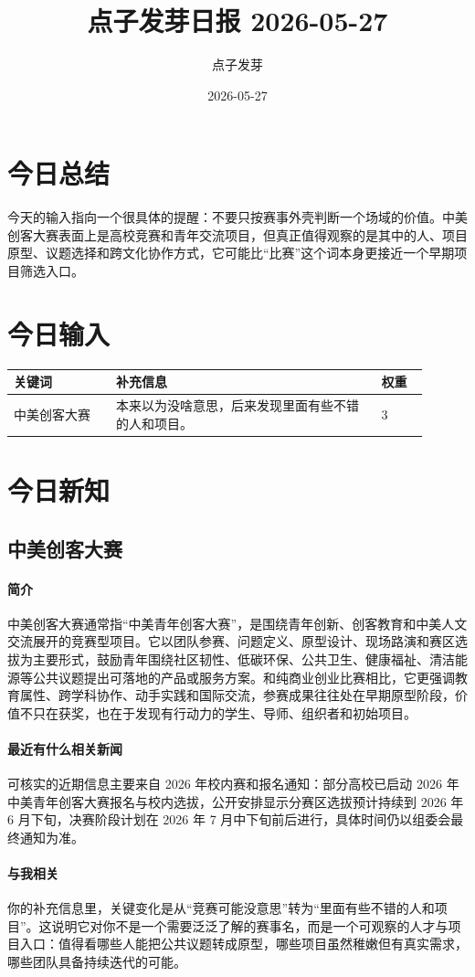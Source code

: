 \documentclass[UTF8,zihao=-4]{ctexart}
\title{\bfseries 点子发芽日报 2026-05-27}
\author{点子发芽}
\date{2026-05-27}
\begin{document}
\maketitle
\section*{今日总结}
今天的输入指向一个很具体的提醒：不要只按赛事外壳判断一个场域的价值。中美创客大赛表面上是高校竞赛和青年交流项目，但真正值得观察的是其中的人、项目原型、议题选择和跨文化协作方式，它可能比“比赛”这个词本身更接近一个早期项目筛选入口。
\section*{今日输入}
\begin{longtable}{|p{0.22\linewidth}|p{0.58\linewidth}|p{0.10\linewidth}|}
\hline
\textbf{关键词} & \textbf{补充信息} & \textbf{权重} \\
\hline
中美创客大赛 & 本来以为没啥意思，后来发现里面有些不错的人和项目。 & 3 \\
\hline
\end{longtable}
\section*{今日新知}
\subsection*{中美创客大赛}
\paragraph{简介} 中美创客大赛通常指“中美青年创客大赛”，是围绕青年创新、创客教育和中美人文交流展开的竞赛型项目。它以团队参赛、问题定义、原型设计、现场路演和赛区选拔为主要形式，鼓励青年围绕社区韧性、低碳环保、公共卫生、健康福祉、清洁能源等公共议题提出可落地的产品或服务方案。和纯商业创业比赛相比，它更强调教育属性、跨学科协作、动手实践和国际交流，参赛成果往往处在早期原型阶段，价值不只在获奖，也在于发现有行动力的学生、导师、组织者和初始项目。
\paragraph{最近有什么相关新闻} 可核实的近期信息主要来自 2026 年校内赛和报名通知：部分高校已启动 2026 年中美青年创客大赛报名与校内选拔，公开安排显示分赛区选拔预计持续到 2026 年 6 月下旬，决赛阶段计划在 2026 年 7 月中下旬前后进行，具体时间仍以组委会最终通知为准。
\paragraph{与我相关} 你的补充信息里，关键变化是从“竞赛可能没意思”转为“里面有些不错的人和项目”。这说明它对你不是一个需要泛泛了解的赛事名，而是一个可观察的人才与项目入口：值得看哪些人能把公共议题转成原型，哪些项目虽然稚嫩但有真实需求，哪些团队具备持续迭代的可能。
\end{document}
